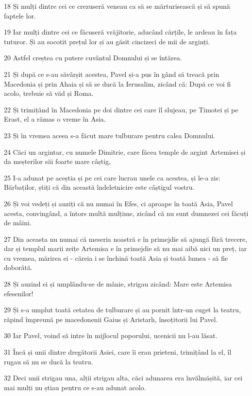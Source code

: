 \par 18 Și mulți dintre cei ce crezuseră veneau ca să se mărturisească și să spună faptele lor.
\par 19 Iar mulți dintre cei ce făcuseră vrăjitorie, aducând cărțile, le ardeau în fața tuturor. Și au socotit prețul lor și au găsit cincizeci de mii de arginți.
\par 20 Astfel creștea cu putere cuvântul Domnului și se întărea.
\par 21 Și după ce s-au săvârșit acestea, Pavel și-a pus în gând să treacă prin Macedonia și prin Ahaia și să se ducă la Ierusalim, zicând că: După ce voi fi acolo, trebuie să văd și Roma.
\par 22 Și trimițând în Macedonia pe doi dintre cei care îl slujeau, pe Timotei și pe Erast, el a rămas o vreme în Asia.
\par 23 Și în vremea aceea s-a făcut mare tulburare pentru calea Domnului.
\par 24 Căci un argintar, cu numele Dimitrie, care făcea temple de argint Artemisei și da meșterilor săi foarte mare câștig,
\par 25 I-a adunat pe aceștia și pe cei care lucrau unele ca acestea, și le-a zis: Bărbaților, știți că din această îndeletnicire este câștigul vostru.
\par 26 Și voi vedeți și auziți că nu numai în Efes, ci aproape în toată Asia, Pavel acesta, convingând, a întors multă mulțime, zicând că nu sunt dumnezei cei făcuți de mâini.
\par 27 Din aceasta nu numai că meseria noastră e în primejdie să ajungă fără trecere, dar și templul marii zeițe Artemisa e în primejdie să nu mai aibă nici un preț, iar cu vremea, mărirea ei - căreia i se închină toată Asia și toată lumea - să fie doborâtă.
\par 28 Și auzind ei și umplându-se de mânie, strigau zicând: Mare este Artemisa efesenilor!
\par 29 Și s-a umplut toată cetatea de tulburare și au pornit într-un cuget la teatru, răpind împreună pe macedonenii Gaius și Aristarh, însoțitorii lui Pavel.
\par 30 Iar Pavel, voind să intre în mijlocul poporului, ucenicii nu l-au lăsat.
\par 31 Încă și unii dintre dregătorii Asiei, care îi erau prieteni, trimițând la el, îl rugau să nu se ducă la teatru.
\par 32 Deci unii strigau una, alții strigau alta, căci adunarea era învălmășită, iar cei mai mulți nu știau pentru ce s-au adunat acolo.
